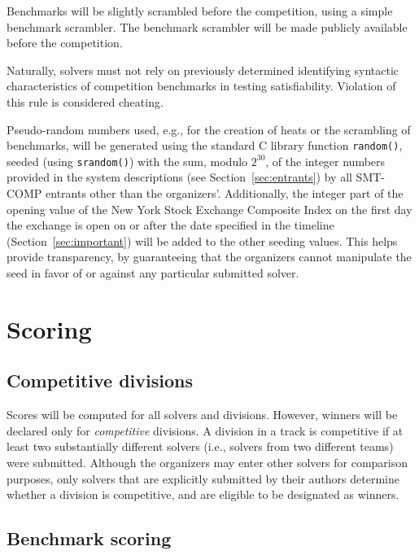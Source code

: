 \documentclass[12pt]{article}
\begin{document}
%
Benchmarks will be slightly scrambled before the competition, using a
simple benchmark scrambler.  The benchmark scrambler will be made
publicly available before the competition.

Naturally, solvers must not rely on previously determined identifying
syntactic characteristics of competition benchmarks in testing
satisfiability.  Violation of this rule is considered cheating.

%
Pseudo-random numbers used, e.g., for the creation of heats or the
scrambling of benchmarks, will be generated using the standard C
library function \texttt{random()}, seeded (using \texttt{srandom()})
with the sum, modulo $2^{30}$, of the integer numbers provided in the
system descriptions (see Section~\ref{sec:entrants}) by all SMT-COMP
entrants other than the organizers'.  Additionally, the integer part
of the opening value of the New York Stock Exchange Composite Index on
the first day the exchange is open on or after the date specified in
the timeline (Section~\ref{sec:important}) will be added to the other
seeding values.  This helps provide transparency, by guaranteeing that
the organizers cannot manipulate the seed in favor of or against any
particular submitted solver.


\section{Scoring}
\label{sec:scoring}

\subsection{Competitive divisions}
  
Scores will be computed for all solvers and divisions.  However,
winners will be declared only for \emph{competitive} divisions.  A
division in a track is competitive if at least two substantially
different solvers (i.e., solvers from two different teams) were
submitted.  Although the organizers may enter other solvers for
comparison purposes, only solvers that are explicitly submitted by
their authors determine whether a division is competitive, and are
eligible to be designated as winners.

\subsection{Benchmark scoring}
\label{sec:benchmark-scoring}
\end{document}
